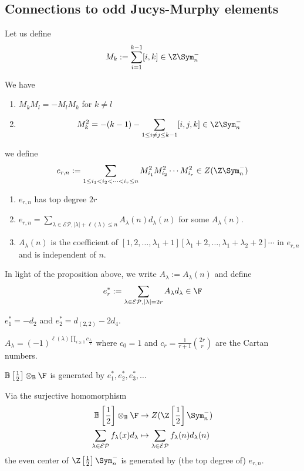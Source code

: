 \documentclass[11pt,leqno,oneside]{amsbook}
\newcommand{\EP}{\mathcal{EP}} %
\newcommand{\B}{\mathbb{B}}
\numberwithin{thm}{section}
\begin{document}
\subsection{Connections to odd Jucys-Murphy elements}
\begin{defn}
  Let us define \[ M_k := \sum_{i=1}^{k-1} [i,k] \in \Z \Sym_n^-
  \]
\end{defn}
\begin{prop}
  We have
  \begin{enumerate}
  \item \(M_k M_l = - M_l M_k\) for \(k \neq l\)
  \item \[
      M_k^2 = -(k-1) - \sum_{1 \leq i \neq j \leq k-1} [i,j,k] \in \Z\Sym_n^-
    \]
  \end{enumerate}
\end{prop}
\begin{defn}
  we define \[
    e_{r,n} := \sum_{1 \leq i_1 < i_2 < \cdots < i_r \leq n} M_{i_1}^2
    M_{i_2}^2 \cdots M_{i_r}^2 \in Z(\Z \Sym_n^-)
  \]
\end{defn}
\begin{prop}
  \begin{enumerate}
  \item \(e_{r,n}\) has top degree \(2r\)
  \item \(e_{r,n} = \sum_{\lambda \in \EP, |\lambda|+\ell(\lambda)
      \leq n} A_\lambda(n) d_\lambda(n)\) for some \(A_\lambda(n)\).
  \item \(A_\lambda(n)\) is the coefficient of \([1,2,\ldots,
    \lambda_1+1][\lambda_1+2,\ldots,\lambda_1+\lambda_2+2]\cdots\) in
    \(e_{r,n}\) and is independent of \(n\). 
  \end{enumerate}
\end{prop}
\begin{defn}
  In light of the proposition above, we write \(A_\lambda :=
  A_\lambda(n)\) and define \[
    e_r^* := \sum_{\lambda \in \EP, |\lambda|=2r} A_\lambda d_\lambda
    \in \F
  \]
\end{defn}
\begin{example}
  \(e_1^* = -d_2\) and \(e_2^* = d_{(2,2)}-2d_4\).
\end{example}
\begin{prop}
  \(A_\lambda = (-1)^{\ell(\lambda) \prod_{i \geq 1}
    c_{\frac{\lambda_i}{2}}}\) where \(c_0 = 1\) and \(c_r =
  \frac{1}{r+1}\binom{2r}{r}\) are the Cartan numbers.
\end{prop}
\begin{thm}
  \(\B\left[\frac{1}{2}\right] \otimes_\B \F\) is generated by
  \(e_1^*, e_2^*, e_3^*, \ldots\)
\end{thm}
\begin{cor}
  Via the surjective homomorphism
  \begin{align*}
    \B\left[\frac{1}{2}\right] \otimes_\B \F
    & \to Z(\Z\left[ \frac{1}{2} \right] \Sym_n^-) \\
    \sum_{\lambda \in \EP} f_\lambda(x) d_\lambda
    & \mapsto \sum_{\lambda \in \EP} f_\lambda(n) d_\lambda(n)
  \end{align*}
  the even center of \(\Z\left[ \frac{1}{2} \right] \Sym_n^-\) is
  generated by (the top degree of) \(e_{r,n}\).
\end{cor}
\end{document}
